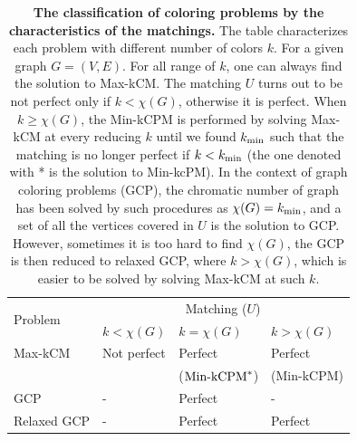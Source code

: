 \documentclass[%
 reprint,
nofootinbib,
 amsmath,amssymb,
 aps,
floatfix,
]{revtex4-2}
\begin{document}
\begin{table}[ht!]
    \centering
    \begin{tabular}{ |p{2.0cm}||p{1.6cm}|p{1.95cm}|p{1.9cm}|  }
      \hline
       \multirow{2}{*}{Problem} & \multicolumn{3}{c|}{Matching ($U$)} \\
       \cline{2-4}
       & $k<\chi(G)$ & $k=\chi(G)$ & $k>\chi(G)$\\
       \hline
       Max-kCM  & Not perfect & Perfect & Perfect \\
                &     & ($\textit{\rm Min-kCPM}^{*}$) & (Min-kCPM)   \\
       GCP      & -  & Perfect &  -\\
       Relaxed GCP  & - & Perfect &  Perfect\\
       \hline
    \end{tabular}
  \caption{\textbf{The classification of coloring problems by the characteristics of the matchings.} The table characterizes each problem with different number of colors $k$. For a given graph $G=(V,E)$. For all range of $k$, one can always find the solution to Max-kCM. The matching $U$ turns out to be not perfect only if $k<\chi(G)$, otherwise it is perfect. When $k\geq \chi(G)$, the Min-kCPM is performed by solving Max-kCM at every reducing $k$ until we found $k_{\rm min}$ such that the matching is no longer perfect if $k<k_{\rm min}$ (the one denoted with * is the solution to Min-kcPM). In the context of graph coloring problems (GCP), the chromatic number of graph has been solved by such procedures as $\chi(G) = k_{\rm min}$, and a set of all the vertices covered in $U$ is the solution to GCP. However, sometimes it is too hard to find $\chi(G)$, the GCP is then reduced to relaxed GCP, where $k>\chi(G)$, which is easier to be solved by solving Max-kCM at such $k$.}
  \label{table:color-problem}
\end{table}
\end{document}
